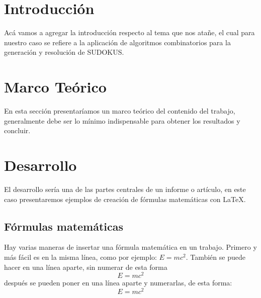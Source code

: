 \documentclass[a4paper,openright,12pt]{report}
\begin{document}
\tableofcontents

\newpage


\section{Introducción}
%
Acá vamos a agregar la introducción respecto al tema que nos atañe, el cual para nuestro caso se refiere a
la aplicación de algoritmos combinatorios para la generación y resolución de SUDOKUS.

\section{Marco Teórico}
%
En esta sección presentaríamos un marco teórico del contenido del trabajo, generalmente debe ser lo mínimo indispensable para obtener los resultados y concluir.

\section{Desarrollo}
%
El desarrollo sería una de las partes centrales de un informe o artículo, en este caso presentaremos ejemplos de creación de fórmulas matemáticas con \LaTeX.

\subsection{Fórmulas matemáticas}
Hay varias maneras de insertar una fórmula matemática en un trabajo. Primero y más fácil es en la misma línea, como por ejemplo: $E=mc^{2}$. También se puede hacer en una línea aparte, sin numerar de esta forma $$E=mc^{2}$$ después se pueden poner en una línea aparte y numerarlas, de esta forma: 
\begin{equation}\label{ec:Ein}
  E=mc^{2}
\end{equation} %
%
\end{document}
